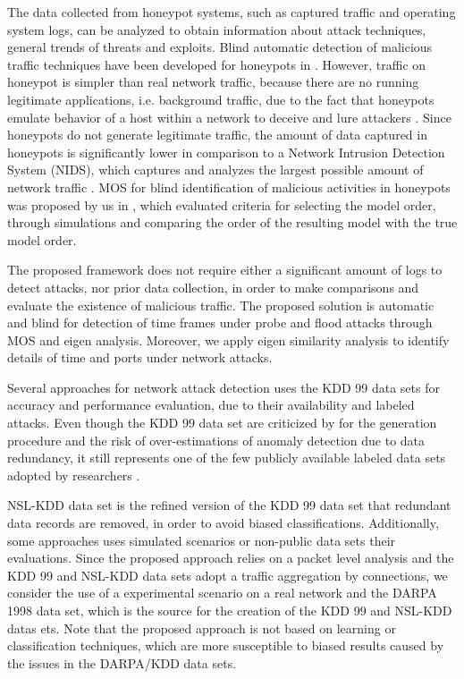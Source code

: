 The data collected from honeypot systems, such as captured traffic and operating system logs, can be analyzed to obtain information about attack techniques, general trends of threats and exploits. Blind automatic detection of malicious traffic techniques have been developed for honeypots in \cite{david2011blind,da2012improved}. However, traffic on honeypot is simpler than real network traffic, because there are no running legitimate applications, i.e. background traffic, due to the fact that honeypots emulate behavior of a host within a network to deceive and lure attackers \cite{zakaria2012review}. Since honeypots do not generate legitimate traffic, the amount of data captured in honeypots is significantly lower in comparison to a Network Intrusion Detection System (NIDS), which captures and analyzes the largest possible amount of network traffic \cite{david2011blind}. MOS for blind identification of malicious activities in honeypots was proposed by us in \cite{david2011blind}, which evaluated criteria for selecting the model order, through simulations and comparing the order of the resulting model with the true model order.

The proposed framework does not require either a significant amount of logs to detect attacks, nor prior data collection, in order to make comparisons and evaluate the existence of malicious traffic. The proposed solution is automatic and blind for detection of time frames under probe and flood attacks through MOS and eigen analysis. Moreover, we apply eigen similarity analysis to identify details of time and ports under network attacks.

Several approaches for network attack detection uses the KDD 99 \cite{ji2016multi,ahmed2016survey,osanaiye2016distributed,bhuyan2014network} data sets for accuracy and performance evaluation, due to their availability and labeled attacks. Even though the KDD 99 data set are criticized by for the generation procedure and the risk of over-estimations of anomaly detection due to data redundancy, it still represents one of the few publicly available labeled data sets adopted by researchers \cite{osanaiye2016distributed,bhuyan2014network}. 

NSL-KDD \cite{tavallaee2009detailed} data set is the refined version of the KDD 99 data set that redundant data records are removed, in order to avoid biased classifications. Additionally, some approaches uses simulated \cite{callegari2011novel} scenarios or non-public data sets their evaluations. Since the proposed approach relies on a packet level analysis and the KDD 99 and NSL-KDD data sets adopt a traffic aggregation by connections, we consider the use of a experimental scenario on a real network and the DARPA 1998 data set, which is the source for the creation of the KDD 99 and NSL-KDD datas ets. Note that the proposed approach is not based on learning or classification techniques, which are more susceptible to biased results caused by the issues in the DARPA/KDD data sets.


